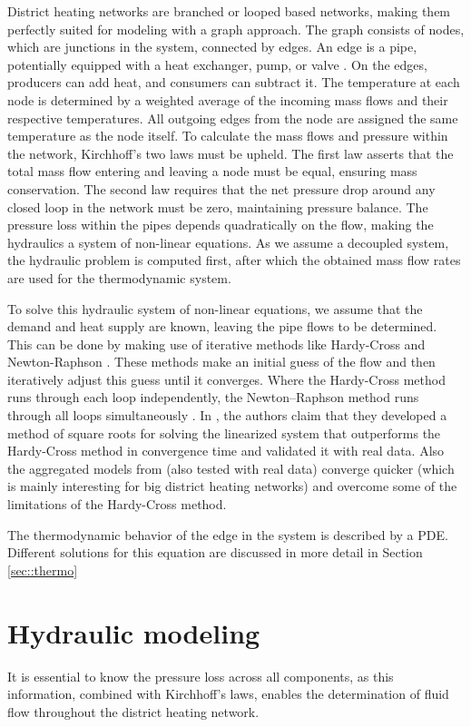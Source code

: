 District heating networks are branched or looped based networks, making them perfectly suited for modeling with a graph approach. The graph consists of nodes, which are junctions in the system, connected by edges. An edge is a pipe, potentially equipped with a heat exchanger, pump, or valve \cite{sibeijn2025economic}. On the edges, producers can add heat, and consumers can subtract it. The temperature at each node is determined by a weighted average of the incoming mass flows and their respective temperatures. All outgoing edges from the node are assigned the same temperature as the node itself. To calculate the mass flows and pressure within the network, Kirchhoff's two laws must be upheld. The first law asserts that the total mass flow entering and leaving a node must be equal, ensuring mass conservation. The second law requires that the net pressure drop around any closed loop in the network must be zero, maintaining pressure balance. The pressure loss within the pipes depends quadratically on the flow, making the hydraulics a system of non-linear equations. As we assume a decoupled system, the hydraulic problem is computed first, after which the obtained mass flow rates are used for the thermodynamic system. 

To solve this hydraulic system of non-linear equations, we assume that the demand and heat supply are known, leaving the pipe flows to be determined. This can be done by making use of iterative methods like Hardy-Cross \cite{HardyCross} and Newton-Raphson \cite{NewtonenHard}. These methods make an initial guess of the flow and then iteratively adjust this guess until it converges. Where the Hardy-Cross method runs through each loop independently, the Newton–Raphson method runs through all loops simultaneously \cite{NewtonenHard}. In \cite{STEVANOVIC}, the authors claim that they developed a method of square roots for solving the linearized system that outperforms the Hardy-Cross method in convergence time and validated it with real data. Also the aggregated models from \cite{LARSEN2002995} (also tested with real data) converge quicker (which is mainly interesting for big district heating networks) and overcome some of the limitations of the Hardy-Cross method.

The thermodynamic behavior of the edge in the system is described by a PDE. Different solutions for this equation are discussed in more detail in Section \ref{sec::thermo}

\section{Hydraulic modeling}
It is essential to know the pressure loss across all components, as this information, combined with Kirchhoff's laws, enables the determination of fluid flow throughout the district heating network. 

